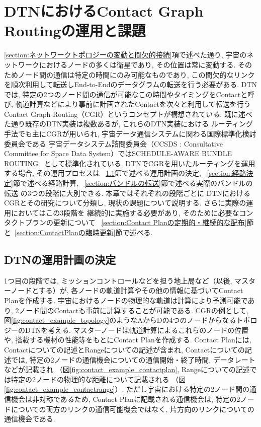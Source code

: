 \chapter{DTNにおけるContact Graph Routingの運用と課題}
\label{chap:cgr_in_dtn}

\ref{section:ネットワークトポロジーの変動と間欠的接続}項で述べた通り, 
宇宙のネットワークにおけるノードの多くは衛星であり, その位置は常に変動する.  
そのためノード間の通信は特定の時間にのみ可能なものであり, 
この間欠的なリンクを順次利用して転送しEnd-to-Endのデータグラムの転送を行う必要がある.  
DTNでは, 特定の2つのノード間の通信が可能なこの時間やタイミングをContactと呼び, 
軌道計算などにより事前に計画されたContactを次々と利用して転送を行う
Contact Graph Routing（CGR）\cite{Fraire2021}というコンセプトが構想されている.  
既に述べた通り既存のDTN実装は複数あるが, これらのDTN実装における
ルーティング手法でも主にCGRが用いられ, 宇宙データ通信システムに関わる国際標準化検討委員会である
宇宙データシステム諮問委員会（CCSDS : Consultative Committee 
for Space Data System）ではSCHEDULE-AWARE BUNDLE ROUTING
~\cite{schedule_aware_bundle_routing}として標準化されている.  
DTNでCGRを用いたルーティングを運用する場合, その運用プロセスは
~\ref{section:運用計画の決定}節で述べる運用計画の決定, 
~\ref{section:経路決定}節で述べる経路計算, 
~\ref{section:バンドルの転送}節で述べる実際のバンドルの転送
の3つの段階に大別できる.  本章ではそれぞれの段階ごとに
DTNにおけるCGRとその研究について分類し, 現状の課題について説明する.  
さらに実際の運用においてはこの3段階を
継続的に実施する必要があり, そのために必要なコンタクトプランの更新について
~\ref{section:Contact Planの定期的・継続的な配布}節と~\ref{section:ContactPlanの臨時更新}節で述べる.  

\section{DTNの運用計画の決定}
\label{section:運用計画の決定}
1つ目の段階では, ミッションコントロールなどを担う地上局など（以後, マスターノードとする）が, 
各ノードの軌道計算やその他の情報に基づいてContact Planを作成する.  
宇宙におけるノードの物理的な軌道は計算により予測可能であり, 
2ノード間のContactも事前に計算することが可能である.   
CGRの例として, 図\ref{fig:contact_example_topology}のようなAからDの4つのノードからなるトポロジーのDTNを考える.  
マスターノードは軌道計算によるこれらのノードの位置や, 搭載する機材の性能等をもとにContact Planを作成する.  
Contact Planには, Contactについての記述とRangeについての記述が含まれ, 
Contactについての記述では, 特定の2ノードの通信機会についての通信開始・終了時間, データレートなどが記載され
（図\ref{fig:contact_example_contactplan}, Rangeについての記述では特定の2ノードの物理的な距離について記載される
（図\ref{fig:contact_example_contactrange}）.  
ただし宇宙における特定の2ノード間の通信機会は非対称であるため, 
Contact Planに記載される通信機会は, 特定の2ノードについての両方のリンクの通信可能機会ではなく, 
片方向のリンクについての通信機会である. 

